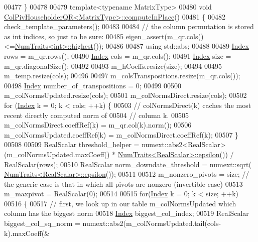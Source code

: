 \begin{DoxyCode}
00477 \}
00478 
00479 \textcolor{keyword}{template}<\textcolor{keyword}{typename} MatrixType>
00480 \textcolor{keywordtype}{void} \hyperlink{group___q_r___module_class_eigen_1_1_col_piv_householder_q_r}{ColPivHouseholderQR<MatrixType>::computeInPlace}()
00481 \{
00482   check\_template\_parameters();
00483 
00484   \textcolor{comment}{// the column permutation is stored as int indices, so just to be sure:}
00485   eigen\_assert(m\_qr.cols()<=\hyperlink{group___core___module_struct_eigen_1_1_num_traits}{NumTraits<int>::highest}());
00486 
00487   \textcolor{keyword}{using} std::abs;
00488 
00489   \hyperlink{namespace_eigen_a62e77e0933482dafde8fe197d9a2cfde}{Index} rows = m\_qr.rows();
00490   \hyperlink{namespace_eigen_a62e77e0933482dafde8fe197d9a2cfde}{Index} cols = m\_qr.cols();
00491   \hyperlink{namespace_eigen_a62e77e0933482dafde8fe197d9a2cfde}{Index} size = m\_qr.diagonalSize();
00492 
00493   m\_hCoeffs.resize(size);
00494 
00495   m\_temp.resize(cols);
00496 
00497   m\_colsTranspositions.resize(m\_qr.cols());
00498   \hyperlink{namespace_eigen_a62e77e0933482dafde8fe197d9a2cfde}{Index} number\_of\_transpositions = 0;
00499 
00500   m\_colNormsUpdated.resize(cols);
00501   m\_colNormsDirect.resize(cols);
00502   \textcolor{keywordflow}{for} (\hyperlink{namespace_eigen_a62e77e0933482dafde8fe197d9a2cfde}{Index} k = 0; k < cols; ++k) \{
00503     \textcolor{comment}{// colNormsDirect(k) caches the most recent directly computed norm of}
00504     \textcolor{comment}{// column k.}
00505     m\_colNormsDirect.coeffRef(k) = m\_qr.col(k).norm();
00506     m\_colNormsUpdated.coeffRef(k) = m\_colNormsDirect.coeffRef(k);
00507   \}
00508 
00509   RealScalar threshold\_helper =  numext::abs2<RealScalar>(m\_colNormsUpdated.maxCoeff() * 
      \hyperlink{group___core___module_struct_eigen_1_1_num_traits}{NumTraits<RealScalar>::epsilon}()) / RealScalar(rows);
00510   RealScalar norm\_downdate\_threshold = numext::sqrt(
      \hyperlink{group___core___module_struct_eigen_1_1_num_traits}{NumTraits<RealScalar>::epsilon}());
00511 
00512   m\_nonzero\_pivots = size; \textcolor{comment}{// the generic case is that in which all pivots are nonzero (invertible case)}
00513   m\_maxpivot = RealScalar(0);
00514 
00515   \textcolor{keywordflow}{for}(\hyperlink{namespace_eigen_a62e77e0933482dafde8fe197d9a2cfde}{Index} k = 0; k < size; ++k)
00516   \{
00517     \textcolor{comment}{// first, we look up in our table m\_colNormsUpdated which column has the biggest norm}
00518     \hyperlink{namespace_eigen_a62e77e0933482dafde8fe197d9a2cfde}{Index} biggest\_col\_index;
00519     RealScalar biggest\_col\_sq\_norm = numext::abs2(m\_colNormsUpdated.tail(cols-k).maxCoeff(&

\end{DoxyCode}
